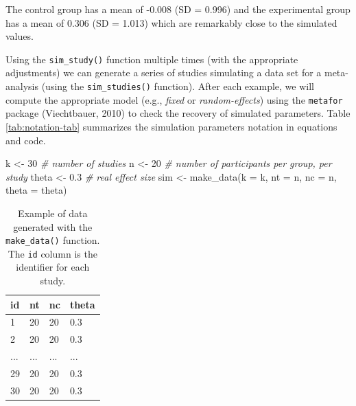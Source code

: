 \documentclass[
  man,floatsintext]{apa6}
\newenvironment{Shaded}{\begin{snugshade}}{\end{snugshade}}
\newcommand{\AttributeTok}[1]{\textcolor[rgb]{0.77,0.63,0.00}{#1}}
\newcommand{\CommentTok}[1]{\textcolor[rgb]{0.56,0.35,0.01}{\textit{#1}}}
\newcommand{\DecValTok}[1]{\textcolor[rgb]{0.00,0.00,0.81}{#1}}
\newcommand{\FloatTok}[1]{\textcolor[rgb]{0.00,0.00,0.81}{#1}}
\newcommand{\FunctionTok}[1]{\textcolor[rgb]{0.00,0.00,0.00}{#1}}
\newcommand{\NormalTok}[1]{#1}
\newcommand{\OtherTok}[1]{\textcolor[rgb]{0.56,0.35,0.01}{#1}}
\begin{document}
\normalsize

\scriptsize

\normalsize

The control group has a mean of -0.008 (SD = 0.996) and the experimental group has a mean of 0.306 (SD = 1.013) which are remarkably close to the simulated values.

Using the \texttt{sim\_study()} function multiple times (with the appropriate adjustments) we can generate a series of studies simulating a data set for a meta-analysis (using the \texttt{sim\_studies()} function). After each example, we will compute the appropriate model (e.g., \emph{fixed} or \emph{random-effects}) using the \texttt{metafor} package (Viechtbauer, 2010) to check the recovery of simulated parameters. Table \ref{tab:notation-tab} summarizes the simulation parameters notation in equations and code.

\scriptsize

\begin{Shaded}
\begin{Highlighting}[]
\NormalTok{k }\OtherTok{\textless{}{-}} \DecValTok{30} \CommentTok{\# number of studies}
\NormalTok{n }\OtherTok{\textless{}{-}} \DecValTok{20} \CommentTok{\# number of participants per group, per study}
\NormalTok{theta }\OtherTok{\textless{}{-}} \FloatTok{0.3} \CommentTok{\# real effect size}
\NormalTok{sim }\OtherTok{\textless{}{-}} \FunctionTok{make\_data}\NormalTok{(}\AttributeTok{k =}\NormalTok{ k, }\AttributeTok{nt =}\NormalTok{ n, }\AttributeTok{nc =}\NormalTok{ n, }\AttributeTok{theta =}\NormalTok{ theta)}
\end{Highlighting}
\end{Shaded}

\normalsize

\scriptsize

\begin{table}[H]

\begin{center}
\begin{threeparttable}

\caption{\label{tab:sim-data-example-tab}Example of data generated with the \texttt{make\_data()} function. The \texttt{id} column is the identifier for each study.}

\small{

\begin{tabular}{llll}
\toprule
id & \multicolumn{1}{c}{nt} & \multicolumn{1}{c}{nc} & \multicolumn{1}{c}{theta}\\
\midrule
1 & 20 & 20 & 0.3\\
2 & 20 & 20 & 0.3\\
... & ... & ... & ...\\
29 & 20 & 20 & 0.3\\
30 & 20 & 20 & 0.3\\
\bottomrule
\end{tabular}

}

\end{threeparttable}
\end{center}

\end{table}
\end{document}
